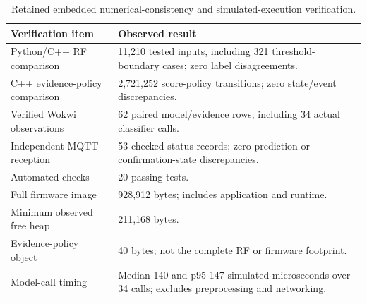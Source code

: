 \begin{table}[t]
\centering
\caption{Retained embedded numerical-consistency and simulated-execution verification.}
\label{tab:embedded}
\begin{tabularx}{\textwidth}{lX}
\toprule
Verification item & Observed result \\
\midrule
Python/C++ RF comparison & 11,210 tested inputs, including 321 threshold-boundary cases; zero label disagreements. \\
C++ evidence-policy comparison & 2,721,252 score-policy transitions; zero state/event discrepancies. \\
Verified Wokwi observations & 62 paired model/evidence rows, including 34 actual classifier calls. \\
Independent MQTT reception & 53 checked status records; zero prediction or confirmation-state discrepancies. \\
Automated checks & 20 passing tests. \\
Full firmware image & 928,912 bytes; includes application and runtime. \\
Minimum observed free heap & 211,168 bytes. \\
Evidence-policy object & 40 bytes; not the complete RF or firmware footprint. \\
Model-call timing & Median 140 and p95 147 simulated microseconds over 34 calls; excludes preprocessing and networking. \\
\bottomrule
\end{tabularx}
\end{table}
